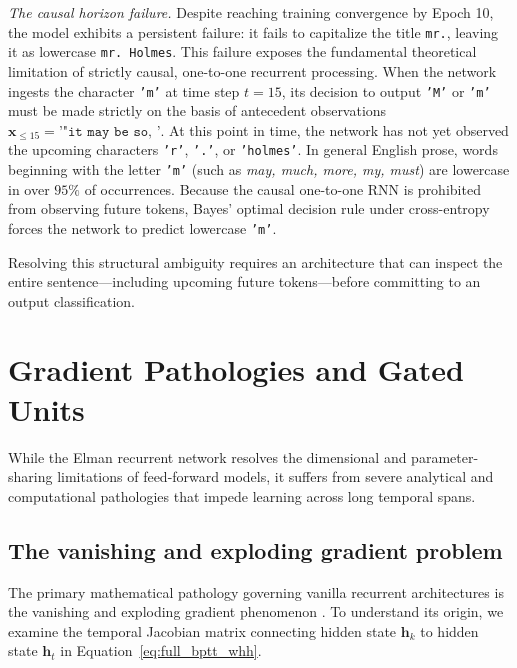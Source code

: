 \documentclass[../../main.tex]{subfiles}
\begin{document}
\textit{The causal horizon failure.} Despite reaching training convergence by Epoch 10, the model exhibits a persistent failure: it fails to capitalize the title \texttt{mr.}, leaving it as lowercase \texttt{mr. Holmes}. This failure exposes the fundamental theoretical limitation of strictly causal, one-to-one recurrent processing. When the network ingests the character \texttt{'m'} at time step $t=15$, its decision to output \texttt{'M'} or \texttt{'m'} must be made strictly on the basis of antecedent observations $\mathbf{x}_{\le 15} = \texttt{'"it may be so, '}$. At this point in time, the network has not yet observed the upcoming characters \texttt{'r'}, \texttt{'.'}, or \texttt{'holmes'}. In general English prose, words beginning with the letter \texttt{'m'} (such as \textit{may, much, more, my, must}) are lowercase in over $95\%$ of occurrences. Because the causal one-to-one RNN is prohibited from observing future tokens, Bayes' optimal decision rule under cross-entropy forces the network to predict lowercase \texttt{'m'}.

Resolving this structural ambiguity requires an architecture that can inspect the entire sentence—including upcoming future tokens—before committing to an output classification.

\clearpage
\section{Gradient Pathologies and Gated Units}
\label{sec:rnn_pathologies_gated}

While the Elman recurrent network resolves the dimensional and parameter-sharing limitations of feed-forward models, it suffers from severe analytical and computational pathologies that impede learning across long temporal spans.

\subsection{The vanishing and exploding gradient problem}
\label{subsec:rnn_vanishing_exploding_gradients}

The primary mathematical pathology governing vanilla recurrent architectures is the vanishing and exploding gradient phenomenon \citep{bengio1994,pascanu2013difficulty}. To understand its origin, we examine the temporal Jacobian matrix connecting hidden state $\mathbf{h}_k$ to hidden state $\mathbf{h}_t$ in Equation~\ref{eq:full_bptt_whh}.
\end{document}
